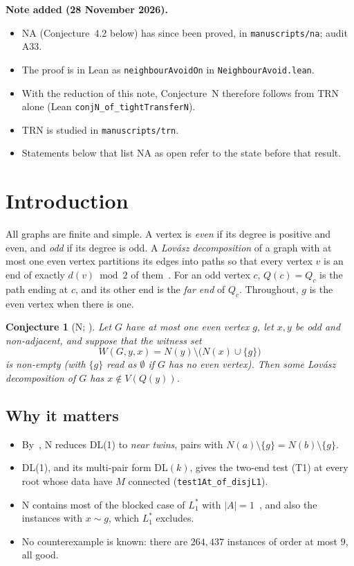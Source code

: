 \documentclass[11pt]{amsart}
\newtheorem{conjecture}[theorem]{Conjecture}
\theoremstyle{definition}
\newcommand{\lean}[1]{\quad{\footnotesize[Lean: \texttt{#1}]}}
\begin{document}
\noindent\textbf{Note added (28 November 2026).}
\begin{itemize}
\item NA (Conjecture~4.2 below) has since been proved, in \texttt{manuscripts/na}; audit A33.
\item The proof is in Lean as \texttt{neighbourAvoidOn} in \texttt{NeighbourAvoid.lean}.
\item With the reduction of this note, Conjecture~N therefore follows from TRN alone (Lean \texttt{conjN\_of\_tightTransferN}).
\item TRN is studied in \texttt{manuscripts/trn}.
\item Statements below that list NA as open refer to the state before that result.
\end{itemize}
\maketitle

\section{Introduction}\label{sec:intro}

All graphs are finite and simple. A vertex is \emph{even} if its degree is positive and even, and
\emph{odd} if its degree is odd. A \emph{Lov\'asz decomposition} of a graph with at most one even
vertex partitions its edges into paths so that every vertex $v$ is an end of exactly $d(v)\bmod2$
of them~\cite{L68}. For an odd vertex $c$, $Q(c)=Q_c$ is the path ending at $c$, and its other end is
the \emph{far end} of $Q_c$. Throughout, $g$ is the even vertex when there is one.

\begin{conjecture}[N; {\cite[Conjecture~9.1]{DL}}]\label{conj:n}
Let $G$ have at most one even vertex $g$, let $x,y$ be odd and non-adjacent, and suppose that the
\emph{witness set}
\[
W(G,y,x)=N(y)\setminus\bigl(N(x)\cup\{g\}\bigr)
\]
is non-empty (with $\{g\}$ read as $\emptyset$ if $G$ has no even vertex). Then some Lov\'asz decomposition of $G$ has $x\notin V(Q(y))$.
\lean{ConjNOn}
\end{conjecture}

\subsection*{Why it matters}
\begin{itemize}
\item By~\cite[Prop.~9.2]{DL}, N reduces DL(1) to \emph{near twins}, pairs with
$N(a)\setminus\{g\}=N(b)\setminus\{g\}$.
\item DL(1), and its multi-pair form DL$(k)$, gives the two-end test (T1) at every root whose data
have $M$ connected (\texttt{test1At\_of\_disjL1}).
\item N contains most of the blocked case of $L_1^*$ with $|A|=1$~\cite[Remark~9.3]{DL}, and also
the instances with $x\sim g$, which $L_1^*$ excludes.
\item No counterexample is known: there are $264{,}437$ instances of order at most $9$, all good.
\end{itemize}
\end{document}
